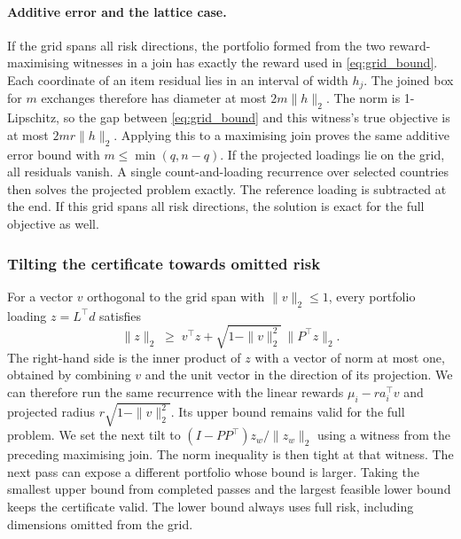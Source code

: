 \paragraph{Additive error and the lattice case.}
If the grid spans all risk directions, the portfolio formed from the two
reward-maximising witnesses in a join has exactly the reward used in
\eqref{eq:grid_bound}. Each coordinate of an item residual lies in an interval of
width $h_j$. The joined box for $m$ exchanges therefore has diameter at most
$2m\|h\|_2$. The norm is 1-Lipschitz, so the gap between \eqref{eq:grid_bound}
and this witness's true objective is at most $2mr\|h\|_2$. Applying this to
a maximising join proves the same additive error bound with
$m\leq\min(q,n-q)$. If the projected loadings lie on the grid, all residuals
vanish. A single count-and-loading recurrence over selected countries then
solves the projected problem exactly. The reference loading is subtracted
at the end. If this grid spans all risk directions, the solution is exact
for the full objective as well.

\subsubsection{Tilting the certificate towards omitted risk}

For a vector $v$ orthogonal to the grid span with $\|v\|_2\leq1$, every portfolio
loading $z=L^\top d$ satisfies
\[
 \|z\|_2 \;\geq\;
    v^\top z+\sqrt{1-\|v\|_2^2}\,\|P^\top z\|_2 .
\]
The right-hand side is the inner product of $z$ with a vector of norm at most
one, obtained by combining $v$ and the unit vector in the direction of its
projection. We can therefore run the same recurrence with the linear rewards
$\mu_i-r a_i^\top v$ and projected radius $r\sqrt{1-\|v\|_2^2}$. Its upper
bound remains valid for the full problem. We set the next tilt to
$(I-PP^\top)z_w/\|z_w\|_2$ using a witness from the preceding maximising join.
The norm inequality is then tight at that witness. The next pass can expose
a different portfolio whose bound is larger. Taking the smallest upper bound
from completed passes and the largest feasible lower bound keeps the certificate
valid. The lower bound always uses full risk, including dimensions omitted
from the grid.

